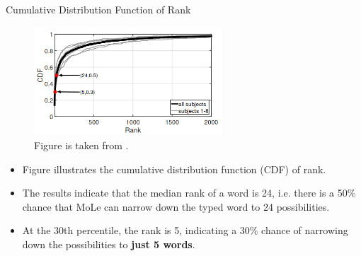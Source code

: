 \documentclass[ucs,9pt]{beamer}
\begin{document}
\begin{frame}{Cumulative Distribution Function of Rank}
\begin{figure}
	\centering
	\includegraphics[width=7cm]{imgs/cdfInferTyped.png}
	\caption{Figure is taken from \cite{b1}.}
\end{figure}
	
\begin{itemize}
	\item Figure illustrates the cumulative distribution function (CDF) of rank. %
	 \item The results indicate that the median rank of a word is 24, i.e. there is a 50\% chance that MoLe can narrow down the typed word to 24 possibilities. 
	 \item At the 30th percentile, the rank is 5, indicating a 30\% chance of narrowing down the possibilities to \textbf{just 5 words}. %
\end{itemize}
\end{frame}
\end{document}
